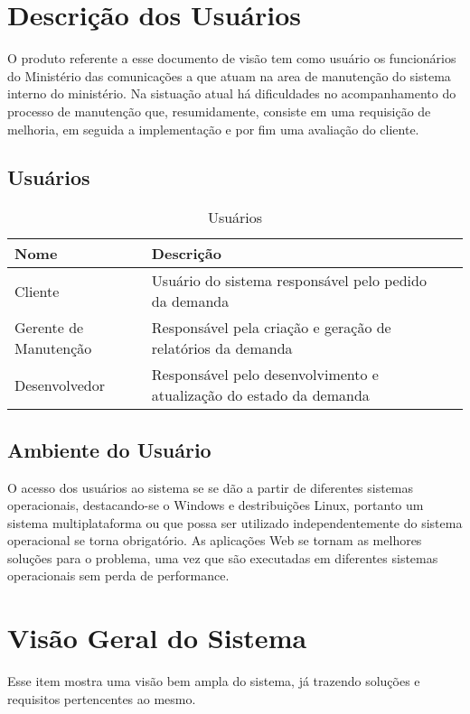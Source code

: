 \section{Descrição dos Usuários}

O produto referente a esse documento de visão tem como usuário os funcionários do Ministério das comunicações a que atuam na area de manutenção do sistema interno do ministério. Na sistuação atual  há dificuldades no acompanhamento do processo de manutenção que, resumidamente, consiste em uma requisição de melhoria, em seguida a implementação e por fim uma avaliação do cliente.

\subsection{Usuários}

\begin{table}[H]
	\begin{tabular}{|l| p{7cm} | p{6cm} |}
		\hline
		\textbf{Nome} & \textbf{Descrição}\tabularnewline
		\hline
		Cliente & Usuário do sistema responsável pelo pedido da demanda\tabularnewline
		\hline
		Gerente de Manutenção & Responsável pela criação e geração de relatórios da demanda\tabularnewline
		\hline
		Desenvolvedor & Responsável pelo desenvolvimento e atualização do estado da demanda\tabularnewline
		\hline
	\end{tabular}
	\caption{Usuários}
	\label{Usuarios}
\end{table}

\subsection{Ambiente do Usuário}

O acesso dos usuários ao sistema se se dão a partir de diferentes sistemas operacionais, destacando-se o Windows e destribuições Linux, portanto um sistema multiplataforma ou que possa ser utilizado independentemente do sistema operacional se torna obrigatório. As aplicações Web se tornam as melhores soluções para o problema, uma vez que são executadas em diferentes sistemas operacionais sem perda de performance.

\section{Visão Geral do Sistema}

Esse item mostra uma visão bem ampla do sistema, já trazendo soluções e requisitos pertencentes ao mesmo.

